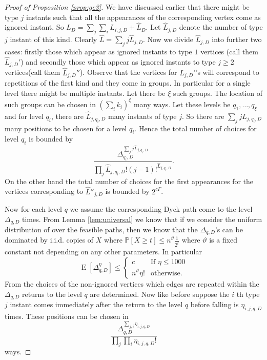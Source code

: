 \documentclass[12pt]{article}
\numberwithin{equation}{section}
\numberwithin{equation}{section}
\theoremstyle{definition}
\DeclareMathOperator{\E}{E} \DeclareMathOperator{\var}{Var}
\renewcommand{\1}{\bf 1}
\begin{document}
\begin{proof}[Proof of Proposition \ref{prop:ge3}]
\noindent 
We have discussed earlier that there might be type $j$ instants such that all the appearances of the corresponding vertex come as ignored instant. So $L_{D}=\sum_{j}\sum_{i}L_{i,j,D} + \hat{L}_{D}$. Let $\hat{L}_{j,D}$ denote the number of type $j$ instant of this kind. Clearly $\hat{L}=\sum_{j} j\hat{L}_{j,D}$. Now we divide $\hat{L}_{j,D}$ into further two cases:
firstly those which appear as ignored instants to type $1$ vertices (call them $\hat{L}_{j,D}'$) and secondly those which appear as ignored instants to type $j \ge 2$ vertices(call them $\hat{L}_{j,D}''$). 
Observe that the vertices for $\hat{L}_{j,D}'$'s will correspond to repetitions of the first kind and they come in groups. In particular for a single level there might be multiple instants. Let there be $\xi$ such groups. The location of such groups can be chosen in $\left( \sum_{i} k_{i}\right)^{\xi}$ many ways. Let these levels be $q_{1},\ldots, q_{\xi}$ and for level $q_{i}$, there are $\hat{L}_{j,q_{i},D}$ many instants of type $j$. So there are $\sum_{j}j\hat{L}_{j,q_{i},D}$ many positions to be chosen for a level $q_{i}$. Hence the total number of choices for level $q_{i}$ is bounded by $$\frac{\Delta_{q_{i},D}^{\sum_{j}j\hat{L}_{j,q_{i},D}}}{\prod_{j}\hat{L}_{j,q_{i},D}!(j-1)!^{\hat{L}_{j,q_{i},D}} }.$$ On the other hand the total number of choices for the first appearances for the vertices corresponding to $\hat{L}''_{j,D}$ is bounded by $2^{c\Gamma}$.
 
Now for each level $q$ we assume the corresponding Dyck path come to the level $\Delta_{q,D}$ times. From Lemma \ref{lem:universal} we know that if we consider the uniform distribution of over the feasible paths, then we know that the $\Delta_{q,D}$'s can be dominated by i.i.d. copies of $X$ where $\mathbb{P}\left[ X \ge t \right]\le n^{\vartheta}\frac{1}{2^{t}}$ where $\vartheta$ is a fixed constant not depending on any other parameters. In particular 
\[
\E\left[ \Delta_{q,D}^{\eta} \right]\le \left\{ 
\begin{array}{ll}
c & \text{If $\eta \le 1000$}\\
n^{\vartheta}\eta! & \text{otherwise}.
\end{array}
\right. 
\]
From the choices of the non-ignored vertices which edges are repeated within the $\Delta_{q,D}$ returns to the level $q$ are determined. Now like before suppose the $i$ th type $j$ instant comes immediately after the return to the level $q$ before falling is $\eta_{i,j,q,D}$ times. These positions can be chosen in 
\begin{equation}\label{eq:dyckrepty1}
\frac{\Delta_{q,D}^{\sum_{j,i}\eta_{i,j,q,D}}}{\prod_{j}\prod_{i}\eta_{i,j,q,D}!}
\end{equation}
ways. 


\end{proof}
\end{document}
